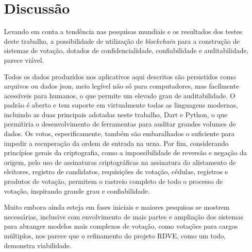 \chapter{Discussão}

Levando em conta a tendência nas pesquisas mundiais e os resultados dos testes deste trabalho, a possibilidade de utilização de \textit{blockchain} para a construção de sistemas de votação, dotados de confidencialidade, confiabilidade e auditabilidade, parece viável.

Todos os dados produzidos nos aplicativos aqui descritos são persistidos como arquivos ou dados \gls{json}, meio legível não só para computadores, mas facilmente acessíveis para humanos, o que permite um elevado grau de auditabilidade. O padrão é aberto e tem suporte em virtualmente todas as linguagens modernas, incluindo as duas principais adotadas neste trabalho, Dart e Python, o que permitiria o desenvolvimento de ferramentas para auditar grandes volumes de dados. Os votos, especificamente, também são embaralhados o suficiente para impedir a recuperação da ordem de entrada na urna. Por fim, considerando princípios gerais da criptografia, como a impossibilidade de reversão e negação da origem, pelo uso de assinaturas criptográficas na assinatura do alistamento de eleitores, registro de candidatos, requisições de votação, cédulas, registros e produtos de votação, permitem o rastreio completo de todo o processo de votação, inspirando grande grau e confiabilidade.

Muito embora ainda esteja em fases iniciais e maiores pesquisas se mostrem necessárias, inclusive com envolvimento de mais partes e ampliação dos sistemas para abranger modelos mais complexos de votação, como votações para cargos múltiplos, nos parece que o refinamento do projeto RDVE, como um todo, demonstra viabilidade.